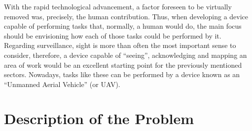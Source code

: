 With the rapid technological advancement, a factor foreseen to be virtually removed was, precisely, the human contribution. Thus, when developing a device capable of performing tasks that, normally, a human would do, the main focus should be envisioning how each of those tasks could be performed by it.
Regarding surveillance, sight is more than often the most important sense to consider, therefore, a device capable of ``seeing'', acknowledging and mapping an area of work would be an excellent starting point for the previously mentioned sectors. Nowadays, tasks like these can be performed by a device known as an ``Unmanned Aerial Vehicle'' (or UAV).


\section{Description of the Problem}\label{I_description}

